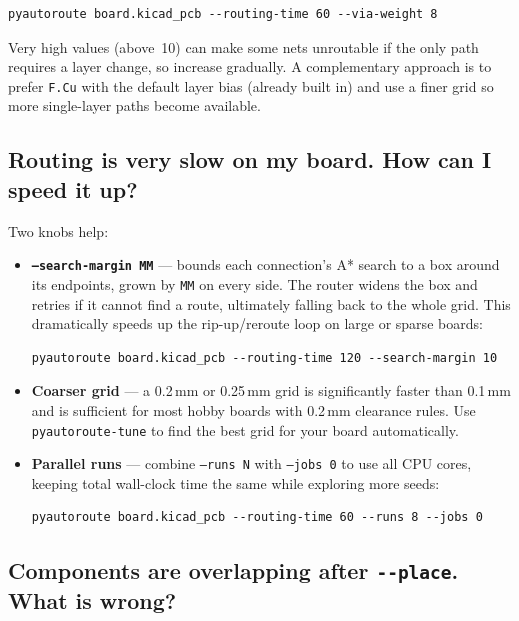 \documentclass[11pt,a4paper]{article}
\begin{document}
\begin{lstlisting}
pyautoroute board.kicad_pcb --routing-time 60 --via-weight 8
\end{lstlisting}

Very high values (above~10) can make some nets unroutable if the only
path requires a layer change, so increase gradually. A complementary
approach is to prefer \texttt{F.Cu} with the default layer bias (already
built in) and use a finer grid so more single-layer paths become available.

\subsection*{Routing is very slow on my board. How can I speed it up?}

Two knobs help:

\begin{itemize}
    \item \textbf{\texttt{--search-margin MM}} --- bounds each
          connection's A* search to a box around its endpoints, grown by
          \texttt{MM} on every side. The router widens the box and retries
          if it cannot find a route, ultimately falling back to the whole
          grid. This dramatically speeds up the rip-up/reroute loop on
          large or sparse boards:
\begin{lstlisting}
pyautoroute board.kicad_pcb --routing-time 120 --search-margin 10
\end{lstlisting}
    \item \textbf{Coarser grid} --- a 0.2\,mm or 0.25\,mm grid is
          significantly faster than 0.1\,mm and is sufficient for most
          hobby boards with 0.2\,mm clearance rules. Use
          \texttt{pyautoroute-tune} to find the best grid for your board
          automatically.
    \item \textbf{Parallel runs} --- combine \texttt{--runs N} with
          \texttt{--jobs 0} to use all CPU cores, keeping total wall-clock
          time the same while exploring more seeds:
\begin{lstlisting}
pyautoroute board.kicad_pcb --routing-time 60 --runs 8 --jobs 0
\end{lstlisting}
\end{itemize}

\subsection*{Components are overlapping after \texttt{-{}-place}. What is wrong?}
\end{document}
